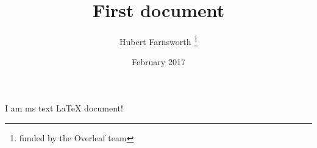 \documentclass[12pt, letterpaper, twoside]{article}
\title{First document}
\author{Hubert Farnsworth \thanks{funded by the Overleaf team}}
\date{February 2017}
\begin{document}
\maketitle

I am ms text \LaTeX{} document!
\end{document}

